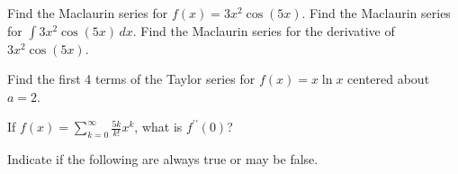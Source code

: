 \documentclass[12pt]{exam}
\begin{document}
\begin{questions}


\question Find the Maclaurin series for $f(x)= 3x^2 \cos(5x)$.
\vspace{1.5in}
\question Find the Maclaurin series for $\int 3x^2 \cos(5x) \, dx$.
\vspace{.1in} 
\question Find the Maclaurin series for the derivative of $3x^2 \cos(5x)$.
\vspace{.1in}

\question Find the first 4 terms of the Taylor series for $f(x)=x\ln x$ centered
about $a=2$.
\vspace{3.9in}

\question If $\displaystyle
f(x)=\sum_{k=0}^\infty \frac{5k}{k!} x^k$, what is $f^{\prime\prime}(0)$?
\vspace{.2in}

\question Indicate if the following are always true or may be false.






\end{questions}
\end{document}
